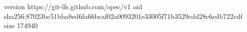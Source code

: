 version https://git-lfs.github.com/spec/v1
oid sha256:87023bc51bba8ed6fa66bcaf02a0093201e33005f71b3529cdd28c6cdb722cdf
size 174940
